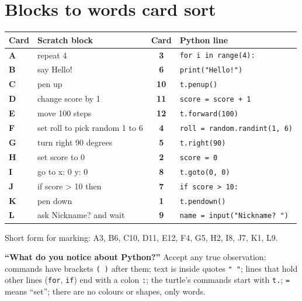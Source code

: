 
\section{Blocks to words card sort}
\begin{answer}
\begin{center}\small
\renewcommand{\arraystretch}{1.2}
\begin{tabular}{@{}l l c l@{}}
\textbf{Card} & \textbf{Scratch block} & \textbf{Card} & \textbf{Python line} \\ \hline
\textbf{A} & repeat 4 & \textbf{3} & \texttt{for i in range(4):} \\
\textbf{B} & say Hello! & \textbf{6} & \texttt{print("Hello!")} \\
\textbf{C} & pen up & \textbf{10} & \texttt{t.penup()} \\
\textbf{D} & change score by 1 & \textbf{11} & \texttt{score = score + 1} \\
\textbf{E} & move 100 steps & \textbf{12} & \texttt{t.forward(100)} \\
\textbf{F} & set roll to pick random 1 to 6 & \textbf{4} & \texttt{roll = random.randint(1, 6)} \\
\textbf{G} & turn right 90 degrees & \textbf{5} & \texttt{t.right(90)} \\
\textbf{H} & set score to 0 & \textbf{2} & \texttt{score = 0} \\
\textbf{I} & go to x: 0 y: 0 & \textbf{8} & \texttt{t.goto(0, 0)} \\
\textbf{J} & if score > 10 then & \textbf{7} & \texttt{if score > 10:} \\
\textbf{K} & pen down & \textbf{1} & \texttt{t.pendown()} \\
\textbf{L} & ask Nickname? and wait & \textbf{9} & \texttt{name = input("Nickname? ")} \\
\end{tabular}
\end{center}
Short form for marking: A3, B6, C10, D11, E12, F4, G5, H2, I8, J7, K1, L9.

\textbf{\enquote{What do you notice about Python?}} Accept any true observation: commands have brackets \texttt{( )} after them; text is inside quotes \texttt{" "}; lines that hold other lines (\texttt{for}, \texttt{if}) end with a colon \texttt{:}; the turtle's commands start with \texttt{t.}; \texttt{=} means \enquote{set}; there are no colours or shapes, only words.
\end{answer}

